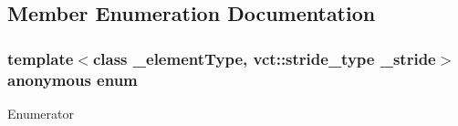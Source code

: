 \subsection{Member Enumeration Documentation}
\hypertarget{classvct_fixed_stride_vector_const_iterator_ad9c45d45b581c90996fb9064a14df79c}{\subsubsection[{anonymous enum}]{\setlength{\rightskip}{0pt plus 5cm}template$<$class \-\_\-element\-Type, vct\-::stride\-\_\-type \-\_\-stride$>$ anonymous enum}}\label{classvct_fixed_stride_vector_const_iterator_ad9c45d45b581c90996fb9064a14df79c}
\begin{Desc}
\item[Enumerator]\par
\begin{description}
\item[{\em 
\hypertarget{classvct_fixed_stride_vector_const_iterator_ad9c45d45b581c90996fb9064a14df79ca94922a822d949144352b904c2a75564d}{S\-T\-R\-I\-D\-E}\label{classvct_fixed_stride_vector_const_iterator_ad9c45d45b581c90996fb9064a14df79ca94922a822d949144352b904c2a75564d}
}]\end{description}
\end{Desc}


